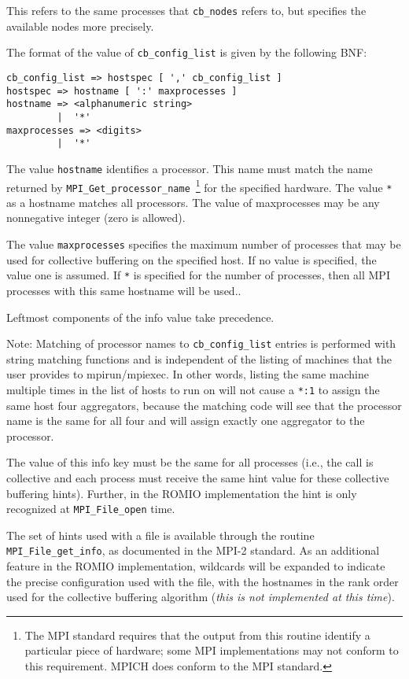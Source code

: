 This refers to the same processes that \texttt{cb\_nodes} refers to,
but specifies the available nodes more precisely.

The format of the value of \texttt{cb\_config\_list} is given by the
following BNF:
\begin{verbatim}
cb_config_list => hostspec [ ',' cb_config_list ]
hostspec => hostname [ ':' maxprocesses ]
hostname => <alphanumeric string>
         |  '*' 
maxprocesses => <digits>
         |  '*'
\end{verbatim}

The value \texttt{hostname} identifies a processor. This name must match
the name returned by \texttt{MPI\_Get\_processor\_name}~\footnote{The
MPI standard requires that the output from this routine identify a
particular piece of hardware; some MPI implementations may not conform
to this requirement. MPICH does conform to the MPI standard.}
%
for the specified hardware. The value \texttt{*} as a hostname matches all
processors. The value of maxprocesses may be any nonnegative integer
(zero is allowed).

The value \texttt{maxprocesses} specifies the maximum number of
processes that may be used for collective buffering on the specified
host. If no value is specified, the value one is assumed. If \texttt{*}
is specified for the number of processes, then all MPI processes with
this same hostname will be used..

Leftmost components of the info value take precedence.

Note: Matching of processor names to \texttt{cb\_config\_list} entries
is performed with string matching functions and is independent of the
listing of machines that the user provides to mpirun/mpiexec.  In other
words, listing the same machine multiple times in the list of hosts to
run on will not cause a \texttt{*:1} to assign the same host four
aggregators, because the matching code will see that the processor name
is the same for all four and will assign exactly one aggregator to the
processor.

The value of this info key must be the same for all processes (i.e., the
call is collective and each process must receive the same hint value for
these collective buffering hints).  Further, in the ROMIO implementation
the hint is only recognized at \texttt{MPI\_File\_open} time.

The set of hints used with a file is available through the routine
\texttt{MPI\_File\_get\_info}, as documented in the MPI-2 standard. 
As an additional feature in the ROMIO implementation, wildcards will
be expanded to indicate the precise configuration used with the file,
with the hostnames in the rank order used for the collective buffering
algorithm (\emph{this is not implemented at this time}).

